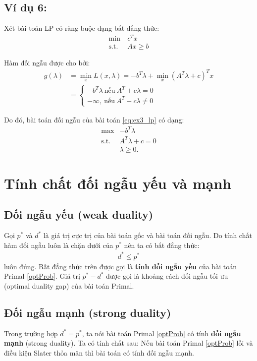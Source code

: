 \documentclass{book}
\begin{document}
\subsection*{Ví dụ 6:}
Xét bài toán LP có ràng buộc dạng bất đẳng thức:
\begin{align}
\mathrm{min~} & c^T x \label{eq:ex3_lp}\\
\mathrm{s.t.~} & Ax \geq b
\end{align}

Hàm đối ngẫu được cho bởi: 
\begin{align*}
g(\lambda) &= \min_x L(x, \lambda) = -b^T \lambda + \min_x(A^T \lambda + c)^T x \\
		& = \begin{cases} -b^T \lambda ~ \textrm{nếu} ~ A^T + c \lambda = 0 \\ 
		-\infty , ~\textrm{nếu}~ A^T + c \lambda \neq 0 \end{cases}
\end{align*}

Do đó, bài toán đối ngẫu của bài toán \eqref{eq:ex3_lp} có dạng:
\begin{align*}
\max & - b^T \lambda \\
\mathrm{s.t.~} & A^T \lambda + c = 0 \\
			& \lambda \geq 0.
\end{align*}

\section{Tính chất đối ngẫu yếu và mạnh}

\subsection{Đối ngẫu yếu (weak duality)}
Gọi $p^*$ và $d^*$ là giá trị cực trị của bài toán gốc và bài toán đối ngẫu.
Do tính chất hàm đối ngẫu luôn là chặn dưới của $p^*$ nên ta có bất đẳng thức:
\begin{align*}
d^* \leq p^*
\end{align*}
luôn đúng. Bất đẳng thức trên được gọi là \textbf{tính đối ngẫu yếu} của bài toán Primal \eqref{optProb}.
Giá trị $p^* - d^*$ được gọi là khoảng cách đối ngẫu tối ưu (optimal duality gap) của bài toán Primal.

\subsection{Đối ngẫu mạnh (strong duality)}
Trong trường hợp $d^* = p^*$, ta nói bài toán Primal \eqref{optProb} có tính \textbf{đối ngẫu mạnh} (strong duality).
Ta có tính chất sau:
Nếu bài toán Primal \eqref{optProb} lồi và điều kiện Slater thỏa mãn thì bài toán có tính đối ngẫu mạnh.
\end{document}
